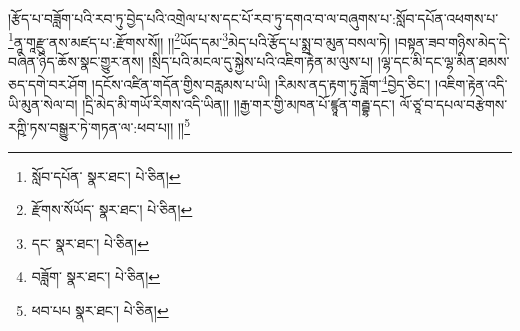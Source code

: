 །རྩོད་པ་བཟློག་པའི་རབ་ཏུ་བྱེད་པའི་འགྲེལ་པ་ས་དང་པོ་རབ་ཏུ་དགའ་བ་ལ་བཞུགས་པ་:སློབ་དཔོན་འཕགས་པ་\footnote{སློབ་དཔོན་  སྣར་ཐང་།  པེ་ཅིན། }ནཱ་གཱརྫུ་ནས་མཛད་པ་:རྫོགས་སོ།། །།\footnote{རྫོགས་སོཡོད་  སྣར་ཐང་།  པེ་ཅིན། }ཡོད་དམ་\footnote{དང་  སྣར་ཐང་།  པེ་ཅིན། }མེད་པའི་རྩོད་པ་སྨྲ་བ་མུན་བསལ་ཏེ། །བསྟན་ཟབ་གཉིས་མེད་དེ་བཞིན་ཉིད་ཆོས་སྣང་གྱུར་ནས། །སྲིད་པའི་མངལ་དུ་སྐྱེས་པའི་འཇིག་རྟེན་མ་ལུས་པ། །ལྷ་དང་མི་དང་ལྷ་མིན་ཐམས་ཅད་དགེ་བར་ཤོག །དངོས་འཛིན་གདོན་གྱིས་བརླམས་པ་ཡི། །རིམས་ནད་རྟག་ཏུ་ཟློག་\footnote{བཟློག་  སྣར་ཐང་།  པེ་ཅིན། }བྱེད་ཅིང་། །འཇིག་རྟེན་འདི་ཡི་མུན་སེལ་བ། །དྲི་མེད་མི་གཡོ་རིགས་འདི་ཡིན།། །།རྒྱ་གར་གྱི་མཁན་པོ་ཛྙཱན་གརྦྷ་དང་། ལོ་ཙཱ་བ་དཔལ་བརྩེགས་རཀྵི་ཏས་བསྒྱུར་ཏེ་གཏན་ལ་:ཕབ་པ།། །།\footnote{ཕབ་པཔ  སྣར་ཐང་།  པེ་ཅིན། }